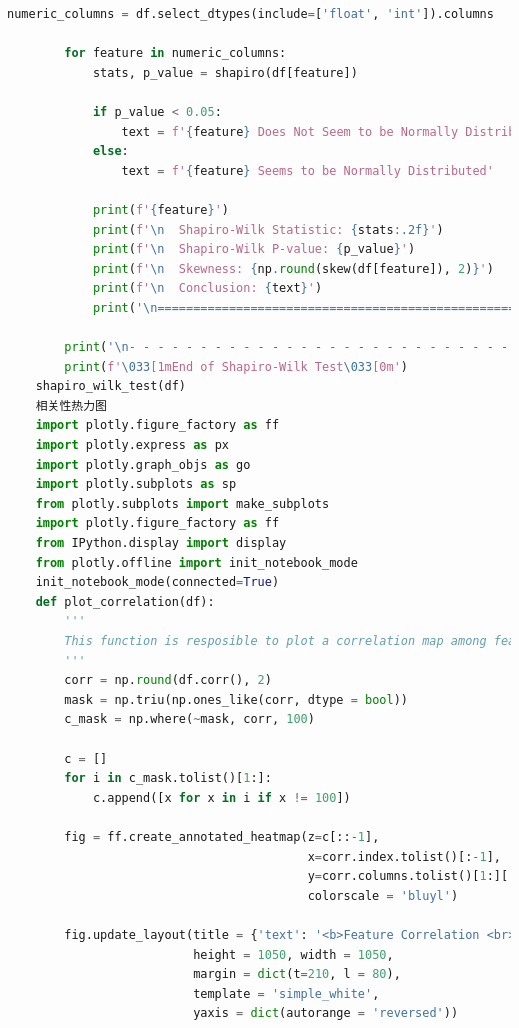 \documentclass{apmcmthesis}
\begin{document}
\begin{lstlisting}[language=Python,caption={The Python Source code of Algorithm}]
        numeric_columns = df.select_dtypes(include=['float', 'int']).columns
    
        for feature in numeric_columns:
            stats, p_value = shapiro(df[feature])
    
            if p_value < 0.05:
                text = f'{feature} Does Not Seem to be Normally Distributed'
            else:
                text = f'{feature} Seems to be Normally Distributed'
    
            print(f'{feature}')
            print(f'\n  Shapiro-Wilk Statistic: {stats:.2f}')
            print(f'\n  Shapiro-Wilk P-value: {p_value}')
            print(f'\n  Skewness: {np.round(skew(df[feature]), 2)}')
            print(f'\n  Conclusion: {text}')
            print('\n===============================================================================================')
    
        print('\n- - - - - - - - - - - - - - - - - - - - - - - - - - - - - - - - - - - - - - - - - - - - - - - - - - - -  \n')
        print(f'\033[1mEnd of Shapiro-Wilk Test\033[0m')
    shapiro_wilk_test(df)
    相关性热力图
    import plotly.figure_factory as ff
    import plotly.express as px
    import plotly.graph_objs as go
    import plotly.subplots as sp
    from plotly.subplots import make_subplots
    import plotly.figure_factory as ff
    from IPython.display import display
    from plotly.offline import init_notebook_mode
    init_notebook_mode(connected=True)
    def plot_correlation(df):
        '''
        This function is resposible to plot a correlation map among features in the dataset
        '''
        corr = np.round(df.corr(), 2)
        mask = np.triu(np.ones_like(corr, dtype = bool))
        c_mask = np.where(~mask, corr, 100)
    
        c = []
        for i in c_mask.tolist()[1:]:
            c.append([x for x in i if x != 100])
        
        fig = ff.create_annotated_heatmap(z=c[::-1],
                                          x=corr.index.tolist()[:-1],
                                          y=corr.columns.tolist()[1:][::-1],
                                          colorscale = 'bluyl')
    
        fig.update_layout(title = {'text': '<b>Feature Correlation <br> <sup>Heatmap</sup></b>'},
                          height = 1050, width = 1050,
                          margin = dict(t=210, l = 80),
                          template = 'simple_white',
                          yaxis = dict(autorange = 'reversed'))
    

\end{lstlisting}
\end{document}
